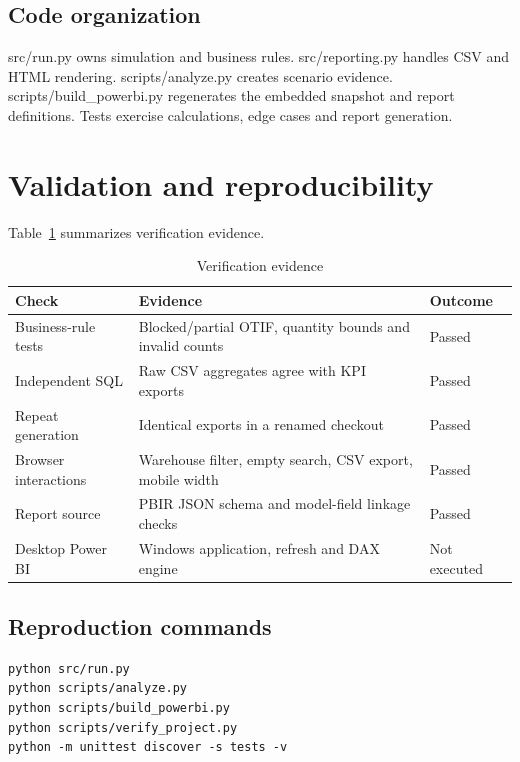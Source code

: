 \documentclass[conference,letterpaper]{IEEEtran}
\begin{document}
\subsection{Code organization}

src/run.py owns simulation and business rules. src/reporting.py handles CSV and HTML rendering. scripts/analyze.py creates scenario evidence. scripts/build\_powerbi.py regenerates the embedded snapshot and report definitions. Tests exercise calculations, edge cases and report generation.


\section{Validation and reproducibility}

Table~\ref{tab:6} summarizes verification evidence.

\begin{table}[H]
\caption{Verification evidence}\label{tab:6}
\centering\footnotesize
\setlength{\tabcolsep}{3pt}
\begin{tabularx}{\columnwidth}{>{\raggedright\arraybackslash}X >{\raggedright\arraybackslash}X >{\raggedright\arraybackslash}X}
\hline
\textbf{Check} & \textbf{Evidence} & \textbf{Outcome} \\
\hline
Business-rule tests & Blocked/partial OTIF, quantity bounds and invalid counts & Passed \\
Independent SQL & Raw CSV aggregates agree with KPI exports & Passed \\
Repeat generation & Identical exports in a renamed checkout & Passed \\
Browser interactions & Warehouse filter, empty search, CSV export, mobile width & Passed \\
Report source & PBIR JSON schema and model-field linkage checks & Passed \\
Desktop Power BI & Windows application, refresh and DAX engine & Not executed \\
\hline
\end{tabularx}
\end{table}

\subsection{Reproduction commands}

\noindent\begin{minipage}{\columnwidth}
\begin{lstlisting}
python src/run.py
python scripts/analyze.py
python scripts/build_powerbi.py
python scripts/verify_project.py
python -m unittest discover -s tests -v
\end{lstlisting}
\end{minipage}
\end{document}

